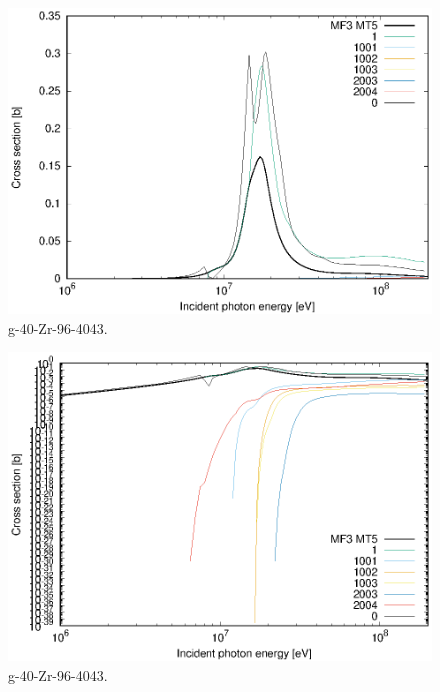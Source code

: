 \begin{figure}
 \includegraphics[width=\linewidth]{eps/g_40-Zr-96_4043.eps}
  \caption{g-40-Zr-96-4043.}
\end{figure}
\begin{figure}
 \includegraphics[width=\linewidth]{eps-log/g_40-Zr-96_4043.eps}
 \caption{g-40-Zr-96-4043.}
\end{figure}
\newpage \clearpage

